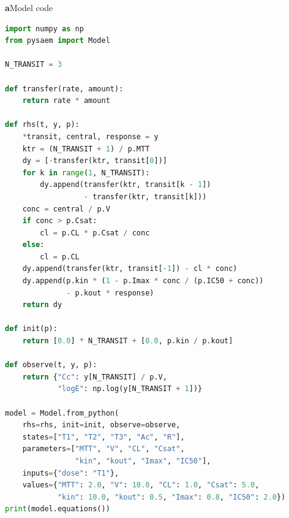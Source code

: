 \documentclass[border=4pt]{standalone}
\begin{document}
\begin{minipage}[t]{9.6cm}
\vspace{0pt}
{\small\textbf{a}\quad Model code}\par\smallskip
\begin{lstlisting}[language=Python]
import numpy as np
from pysaem import Model

N_TRANSIT = 3

def transfer(rate, amount):
    return rate * amount

def rhs(t, y, p):
    *transit, central, response = y
    ktr = (N_TRANSIT + 1) / p.MTT
    dy = [-transfer(ktr, transit[0])]
    for k in range(1, N_TRANSIT):
        dy.append(transfer(ktr, transit[k - 1])
                  - transfer(ktr, transit[k]))
    conc = central / p.V
    if conc > p.Csat:
        cl = p.CL * p.Csat / conc
    else:
        cl = p.CL
    dy.append(transfer(ktr, transit[-1]) - cl * conc)
    dy.append(p.kin * (1 - p.Imax * conc / (p.IC50 + conc))
              - p.kout * response)
    return dy

def init(p):
    return [0.0] * N_TRANSIT + [0.0, p.kin / p.kout]

def observe(t, y, p):
    return {"Cc": y[N_TRANSIT] / p.V,
            "logE": np.log(y[N_TRANSIT + 1])}

model = Model.from_python(
    rhs=rhs, init=init, observe=observe,
    states=["T1", "T2", "T3", "Ac", "R"],
    parameters=["MTT", "V", "CL", "Csat",
                "kin", "kout", "Imax", "IC50"],
    inputs={"dose": "T1"},
    values={"MTT": 2.0, "V": 10.0, "CL": 1.0, "Csat": 5.0,
            "kin": 10.0, "kout": 0.5, "Imax": 0.8, "IC50": 2.0})
print(model.equations())
\end{lstlisting}
\end{minipage}\hspace{0.5cm}%
\end{document}
